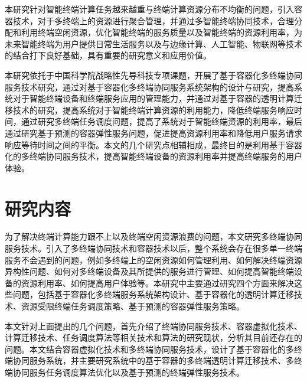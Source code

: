 


本研究针对智能终端计算任务越来越重与终端计算资源分布不均衡的问题，引入容器技术，对于多终端上的资源进行聚合管理，并通过多智能终端协同技术，合理分配和利用终端空闲资源，优化智能终端的服务质量以及智能终端的资源利用率，为未来智能终端为用户提供日常生活服务以及与边缘计算、人工智能、物联网等技术的结合打下良好基础，具有重要的研究意义和应用价值。

本研究依托于中国科学院战略性先导科技专项课题，开展了基于容器化多终端协同服务技术研究，通过对基于容器化多终端协同服务系统架构的设计与研究，提高系统对于智能终端设备和终端服务应用的管理能力，并通过对基于容器的透明计算迁移技术的研究，提高系统对于智能终端计算资源的利用能力，降低终端服务响应时间，通过研究多终端任务调度问题，提高了系统对于智能终端资源的利用率，最后通过研究基于预测的容器弹性服务问题，促进提高资源利用率和降低用户服务请求响应等待时间之间的平衡。本文的几个研究点相辅相成，最终目的是利用基于容器化的多终端协同服务技术，提高智能终端设备的资源利用率并提高终端服务的用户体验。

\section{研究内容}
为了解决终端计算能力跟不上以及终端空闲资源浪费的问题，本文研究多终端协同服务技术。引入了多终端协同技术和容器技术以后，整个系统会存在很多单一终端服务不会遇到的问题，例如多终端上的空闲资源如何管理利用、如何解决终端资源异构性问题、如何对多终端设备及其所提供的服务进行管理、如何提高智能终端设备的资源利用率、如何提高用户体验等。本研究中主要通过研究四个方面来解决这些问题，包括基于容器化多终端服务系统架构设计、基于容器化的透明计算迁移技术、资源受限终端任务调度策略、基于预测的容器弹性服务策略。

本文针对上面提出的几个问题，首先介绍了终端协同服务技术、容器虚拟化技术、计算迁移技术、任务调度算法等相关技术和算法的研究现状，分析其目前还存在的问题。本文结合容器虚拟化技术和多终端协同服务技术，设计了基于容器化的多终端协同服务系统，并主要研究系统中的基于容器的多终端透明计算迁移技术、多终端协同服务任务调度算法优化以及基于预测的终端弹性服务技术。

